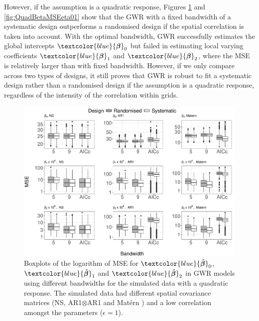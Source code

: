 \documentclass[a4paper]{article} 	%
\newcommand{\Matern}{Mat\'ern }
\newcommand{\zc}[1]{\textcolor{blue}{#1}}
\begin{document}
However, if the assumption is a quadratic response, Figures \ref{fig:QuadBetaMSE} and \ref{fig:QuadBetaMSEeta01} show that the GWR with a fixed bandwidth of a systematic design outperforms a randomised design if the spatial correlation is taken into account. With the optimal bandwidth, GWR successfully estimates the global intercepts $\zc{\bm{\beta}}_0$ but failed in estimating local varying coefficients $\zc{\bm{\beta}}_1$ and $\zc{\bm{\beta}}_2$, where the MSE is relatively larger than with fixed bandwidth. However, if we only compare across two types of designs, it still proves that GWR is robust to fit a systematic design rather than a randomised design if the assumption is a quadratic response, regardless of the intensity of the correlation within grids. 

\begin{figure}[!thp]
	\centering
	\includegraphics[width=\linewidth]{Expt/Col_QuaCombMSE_newpar_V3.pdf}
	\caption{Boxplots of the logarithm of MSE for $\zc{\hat{\bm{\beta}}}_0$, $\zc{\hat{\bm{\beta}}}_1$ and $\zc{\hat{\bm{\beta}}}_2$ in GWR models using different bandwidths for the simulated data with a quadratic response. The simulated data had different spatial covariance matrices (NS, AR1$\otimes$AR1 and \Matern) and a low correlation amongst the parameters ($\epsilon=1$).} \label{fig:QuadBetaMSE}
\end{figure}
\end{document}
